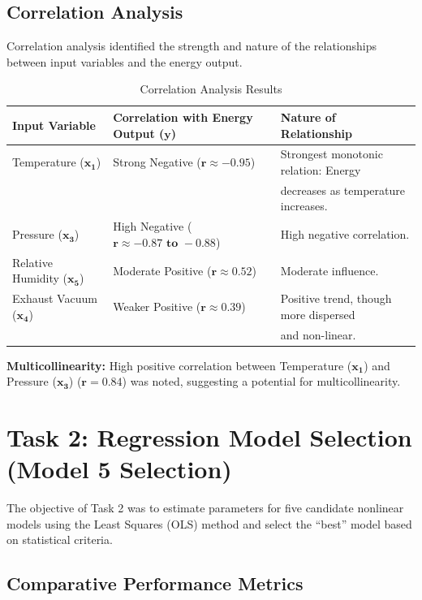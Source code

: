 \documentclass[12pt,a4paper]{article}
\begin{document}
\subsection{Correlation Analysis}

Correlation analysis identified the strength and nature of the relationships between input variables and the energy output.

\begin{table}[H]
\centering
\caption{Correlation Analysis Results}
\begin{tabular}{@{}lll@{}}
\toprule
\textbf{Input Variable} & \textbf{Correlation with Energy Output ($\mathbf{y}$)} & \textbf{Nature of Relationship} \\
\midrule
Temperature ($\mathbf{x_1}$) & Strong Negative ($\mathbf{r \approx -0.95}$) & Strongest monotonic relation: Energy \\
 & & decreases as temperature increases. \\
Pressure ($\mathbf{x_3}$) & High Negative ($\mathbf{r \approx -0.87 \text{ to } -0.88}$) & High negative correlation. \\
Relative Humidity ($\mathbf{x_5}$) & Moderate Positive ($\mathbf{r \approx 0.52}$) & Moderate influence. \\
Exhaust Vacuum ($\mathbf{x_4}$) & Weaker Positive ($\mathbf{r \approx 0.39}$) & Positive trend, though more dispersed \\
 & & and non-linear. \\
\bottomrule
\end{tabular}
\end{table}

\textbf{Multicollinearity:} High positive correlation between Temperature ($\mathbf{x_1}$) and Pressure ($\mathbf{x_3}$) ($\mathbf{r = 0.84}$) was noted, suggesting a potential for multicollinearity.

\section{Task 2: Regression Model Selection (Model 5 Selection)}

The objective of Task 2 was to estimate parameters for five candidate nonlinear models using the Least Squares (OLS) method and select the ``best'' model based on statistical criteria.

\subsection{Comparative Performance Metrics}
\end{document}
